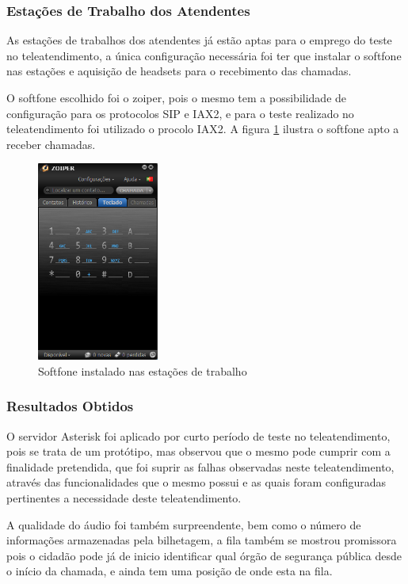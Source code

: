\subsubsection{Estações de Trabalho dos Atendentes}
As estações de trabalhos dos atendentes já estão aptas para o emprego do teste no teleatendimento, a única configuração necessária foi ter que instalar o softfone nas estações e aquisição de headsets para o recebimento das chamadas.

O softfone escolhido foi o zoiper, pois o mesmo tem a possibilidade de configuração para os protocolos SIP e IAX2, e para o teste realizado no teleatendimento foi utilizado o procolo IAX2. A figura \ref{Figura30} ilustra o softfone apto a receber chamadas.

\begin{figure}[h]
	\centering
	\includegraphics[width=4cm]{imagens/zoiper.png}
	\caption{Softfone instalado nas estações de trabalho}
    \label{Figura30}
\end{figure}

\subsubsection{Resultados Obtidos}
O servidor Asterisk foi aplicado por curto período de teste no teleatendimento, pois se trata de um protótipo, mas observou que o mesmo pode cumprir com a finalidade pretendida, que foi suprir as falhas observadas neste teleatendimento, através das funcionalidades que o mesmo possui e as quais foram configuradas pertinentes a necessidade deste teleatendimento.

A qualidade do áudio foi também surpreendente, bem como o número de informações armazenadas pela bilhetagem, a fila também se mostrou promissora pois o cidadão pode já de inicio identificar qual órgão de segurança pública desde o início da chamada, e ainda tem uma posição de onde esta na fila.
